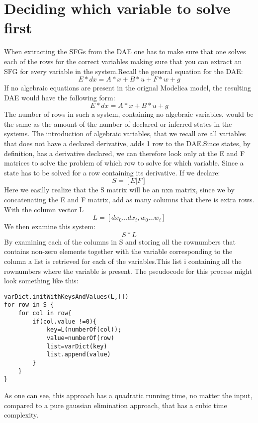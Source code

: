 
\section{Deciding which variable to solve first}
When extracting the SFGs from the DAE one has to make sure that one solves each of the rows for the correct variables making sure that you can extract an SFG for every variable in the system.Recall the general equation for the DAE:
\begin{equation}
E*dx = A*x + B*u + F*w + g
\end{equation}
If no algebraic equations are present in the orignal Modelica model, the resulting DAE would have the following form:
\begin{equation}
E*dx = A*x + B*u + g
\end{equation}
The number of rows in such a system, containing no algebraic variables, would be the same as the amount of the number of declared or inferred states in the systems. The introduction of algebraic variables, that we recall are all variables that does not have a declared derivative, adds 1 row to the DAE.Since states, by definition, has a derivative declared, we can therefore look only at the E and F matrices to solve the problem of which row to solve for which variable. Since a state has to be solved for a row containing its derivative. If we declare:
\begin{equation}
S=[E|F]
\end{equation}
Here we easilly realize that the S matrix will be an nxn matrix, since we by concatenating the E and F matrix, add as many columns that there is extra rows.\\
With the column vector L
\begin{equation}
L=[dx_0...dx_i, w_0...w_i]
\end{equation}
We then examine this system:
\begin{equation}
S*L
\end{equation}
By examining each of the columns in S and storing all the rownumbers that contains non-zero elements together with the variable corresponding to the column a list is retrieved for each of the variables.This  list i containing all the rownumbers where the variable is present.
The pseudocode for this process might look something like this:
\begin{lstlisting}
varDict.initWithKeysAndValues(L,[])
for row in S {
	for col in row{
		if(col.value !=0){
			key=L(numberOf(col));
			value=numberOf(row)
			list=varDict(key)
			list.append(value)		
		}
	}			
}
\end{lstlisting}
As one can see, this approach has a quadratic running time, no matter the input, compared to a pure gaussian elimination approach, that has a cubic time complexity.

